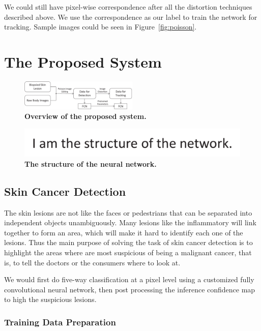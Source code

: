 \documentclass[letterpaper]{article}
\begin{document}
We could still have pixel-wise correspondence after all the distortion techniques described above. We use the correspondence as our label to train the network for tracking. Sample images could be seen in Figure~\ref{fig:poisson}.

\section{The Proposed System}

\begin{figure}
  \centering
  \includegraphics[width=0.5\textwidth]{./pipeline.pdf}
  \caption{\bf Overview of the proposed system.}
  \label{fig:pipeline}
\end{figure}

\begin{figure}[h!]
  \centering
  \includegraphics[width=\textwidth]{./network.pdf}
  \caption{\bf The structure of the neural network.}
  \label{fig:network}
\end{figure}

\subsection{Skin Cancer Detection}

The skin lesions are not like the faces or pedestrians that can be separated into independent objects unambiguously. Many lesions like the inflammatory will link together to form an area, which will make it hard to identify each one of the lesions. Thus the main purpose of solving the task of skin cancer detection is to highlight the areas where are most suspicious of being a malignant cancer, that is, to tell the doctors or the consumers where to look at.

We would first do five-way classification at a pixel level using a customized fully convolutional neural network, then post processing the inference confidence map to high the suspicious lesions.

\subsubsection{Training Data Preparation}
\end{document}
